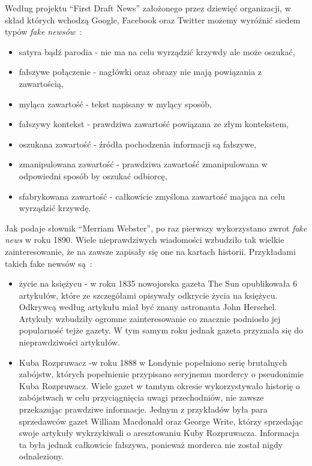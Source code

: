 Według projektu ``First Draft News'' założonego przez dziewięć organizacji, 
w skład których wchodzą Google, Facebook oraz Twitter 
możemy wyróżnić siedem typów \textit{fake newsów}~\cite{TypesOfFakeNews}:
\begin{itemize}
    \item satyra bądź parodia - nie ma na celu wyrządzić krzywdy ale może oszukać,
    \item fałszywe połączenie - nagłówki oraz obrazy nie mają powiązania z zawartością,
    \item myląca zawartość - tekst napisany w mylący sposób,
    \item fałszywy kontekst - prawdziwa zawartość powiązana ze złym kontekstem,
    \item oszukana zawartość - źródła pochodzenia informacji są fałszywe,
    \item zmanipulowana zawartość - prawdziwa zawartość zmanipulowana w odpowiedni sposób by oszukać odbiorcę,
    \item sfabrykowana zawartość - całkowicie zmyślona zawartość mająca na celu wyrządzić krzywdę.
\end{itemize}
Jak podaje słownik ``Merriam Webster'', po raz pierwszy wykorzystano zwrot
\textit{fake news} w roku 1890. Wiele nieprawdziwych wiadomości wzbudziło tak
wielkie zainteresowanie, że na zawsze zapisały się one na kartach historii. Przykładami takich fake newsów są~\cite{examplesoffakenews}:
\begin{itemize}
    \item życie na księżycu - w roku 1835 nowojorska gazeta The Sun opublikowała 6 artykułów, które ze szczegółami
    opisywały odkrycie życia na księżycu. Odkrywcą według artykułu miał być znany astronauta John Herschel.
    Artykuły wzbudziły ogromne zainteresowanie co znacznie podniosło jej popularność tejże gazety. W tym samym roku jednak gazeta
    przyznała się do nieprawdziwości artykułów.
    \item  Kuba Rozpruwacz -w roku 1888 w Londynie popełniono serię brutalnych zabójstw, których popełnienie przypisano 
    seryjnemu mordercy o pseudonimie Kuba Rozpruwacz. Wiele gazet w tamtym okresie wykorzystywało historię o zabójstwach 
    w celu przyciągnięcia uwagi przechodniów, nie zawsze przekazując prawdziwe informacje. Jednym z przykładów była para 
    sprzedawców gazet William Macdonald oraz George Write, którzy sprzedając swoje artykuły wykrzykiwali o aresztowaniu
    Kuby Rozpruwacza. Informacja ta była jednak całkowicie fałszywa, ponieważ morderca nie został nigdy odnaleziony.
\end{itemize}


